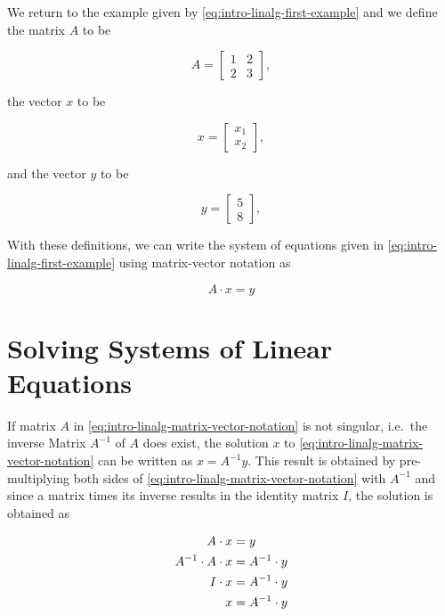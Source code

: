 \documentclass[
]{book}
\theoremstyle{definition}
\theoremstyle{definition}
\theoremstyle{definition}
\theoremstyle{remark}
\begin{document}
We return to the example given by \eqref{eq:intro-linalg-first-example} and we define the matrix \(A\) to be

\[
A = \left[
\begin{array}{cc}
1  &  2 \\
2  &  3
\end{array}
\right], 
\]

the vector \(x\) to be

\[
x = \left[
\begin{array}{c}
x_1  \\
x_2  
\end{array}
\right], 
\]

and the vector \(y\) to be

\[
y = \left[
\begin{array}{c}
5  \\
8  
\end{array}
\right], 
\]

With these definitions, we can write the system of equations given in \eqref{eq:intro-linalg-first-example} using matrix-vector notation as

\begin{equation}
A \cdot x = y
\label{eq:intro-linalg-matrix-vector-notation}
\end{equation}

\hypertarget{intro-linalg-solving-systems-of-linear-equations}{%
\section{Solving Systems of Linear Equations}\label{intro-linalg-solving-systems-of-linear-equations}}

If matrix \(A\) in \eqref{eq:intro-linalg-matrix-vector-notation} is not singular, i.e.~the inverse Matrix \(A^{-1}\) of \(A\) does exist, the solution \(x\) to \eqref{eq:intro-linalg-matrix-vector-notation} can be written as \(x = A^{-1}y\). This result is obtained by pre-multiplying both sides of \eqref{eq:intro-linalg-matrix-vector-notation} with \(A^{-1}\) and since a matrix times its inverse results in the identity matrix \(I\), the solution is obtained as

\begin{align}
            A \cdot x  &=  y \notag \\
A^{-1}\cdot A \cdot x  &=  A^{-1} \cdot y \notag \\
            I \cdot x  &=  A^{-1} \cdot y \notag \\
                    x  &=  A^{-1} \cdot y
\label{eq:intro-linalg-matrix-vector-notation-solution-derivation}
\end{align}
\end{document}
